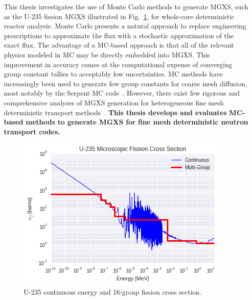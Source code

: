 \documentclass[12pt,twoside]{mitthesis-exec}
\begin{document}

This thesis investigates the use of Monte Carlo methods to generate MGXS, such as the U-235 fission MGXS illustrated in Fig.~\ref{fig:u235-sigf}, for whole-core deterministic reactor analysis. Monte Carlo presents a natural approach to replace engineering prescriptions to approximate the flux with a stochastic approximation of the exact flux. The advantage of a MC-based approach is that all of the relevant physics modeled in MC may be directly embedded into MGXS. This improvement in accuracy comes at the computational expense of converging group constant tallies to acceptably low uncertainties. MC methods have increasingly been used to generate few group constants for coarse mesh diffusion, most notably by the Serpent MC code~\cite{serpent2013manual}. However, there exist few rigorous and comprehensive analyses of MGXS generation for heterogeneous fine mesh deterministic transport methods~\cite{redmond1997multigroup,cai2014condensation,nelson2014improved}. \textbf{This thesis develops and evaluates MC-based methods to generate MGXS for fine mesh deterministic neutron transport codes.}

\begin{figure}[h!]
\centering
\includegraphics[width=0.75\linewidth]{figures/intro/u235-ce-mg-xs}
\caption[U-235 continuous energy and multi-group fission cross section]{U-235 continuous energy and 16-group fission cross section.}
\label{fig:u235-sigf}
\end{figure}
\end{document}

